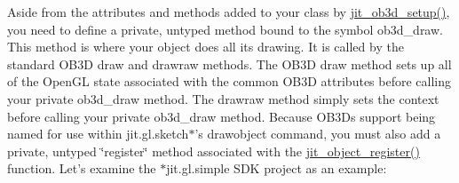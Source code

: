 Aside from the attributes and methods added to your class by \hyperlink{group__ob3dmod_gaee60152a1d507a630e14f0e4f71e86f2}{jit\_\-ob3d\_\-setup()}, you need to define a private, untyped method bound to the symbol ob3d\_\-draw. This method is where your object does all its drawing. It is called by the standard OB3D draw and drawraw methods. The OB3D draw method sets up all of the OpenGL state associated with the common OB3D attributes before calling your private ob3d\_\-draw method. The drawraw method simply sets the context before calling your private ob3d\_\-draw method. Because OB3Ds support being named for use within jit.gl.sketch$\ast$'s drawobject command, you must also add a private, untyped \char`\"{}register\char`\"{} method associated with the \hyperlink{group__objectmod_gabcf088a00f36b6af8ce5896b81e4d0ef}{jit\_\-object\_\-register()} function. Let's examine the $\ast$jit.gl.simple SDK project as an example:


